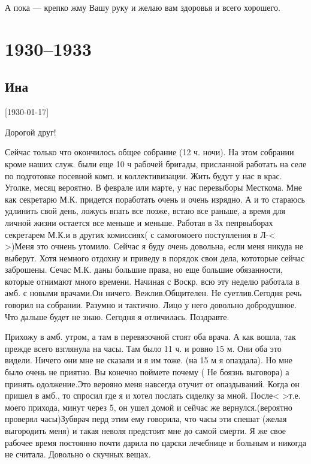 \documentclass[]{memoir}
\begin{document}
А пока --- крепко жму Вашу руку и желаю вам здоровья и всего хорошего.



\chapter{1930--1933}




\section{Ина}

[1930-01-17]



Дорогой друг!

Сейчас только что окончилось общее собрание (12 ч. ночи). На этом собрании кроме наших служ. были еще 10 ч рабочей бригады, присланной работать на селе по подготовке посевной комп. и коллективизации. Жить будут у нас в крас. Уголке, месяц вероятно. В феврале или марте, у нас перевыборы Месткома. Мне как секретарю М.К. придется поработать очень и очень изрядно. А и то стараюсь удлинить свой день, ложусь впать все позже, встаю все раньше, а время для личной жизни остается все меньше и меньше. Работая в 3х пепрвыборах секретарем М.К.и в других комиссиях( с самогомоего поступления в Л-< >)Меня это очнень утомило. Сейчас я буду очень довольна, если меня никуда не выберут. Хотя немного отдохну и приведу в порядок свои дела, кототорые сейчас заброшены. Сечас М.К. даны большие права, но еще большие обязанности, которые отнимают много времени. Начиная с Воскр. всю эту неделю работала в амб. с новыми врачами.Он ничего. Вежлив.Общителен. Не суетлив.Сегодня речь говорил на собрании. Разумно и тактично. Лицо у него довольно добродушное. Что дальше будет не знаю. Сегодня я отличилась. Поздравте.

Прихожу в амб. утром, а там в перевязочной стоят оба врача. А как вошла, так прежде всего взглянула на часы. Там было 11 ч. и ровно 15 м. Они оба это видели. Ничего они мне не сказали и я им тоже. (на 15 м я опаздала). Но мне было очень не приятно. Вы конечно поймете почему ( Не боязнь выговора) а принять одолжение.Это верояно меня навсегда отучит от опаздываний. Когда он пришел в амб., то спросил где я и хотел послать сиделку за мной. После< >т.е. моего прихода, минут через 5, он ушел домой и сейчас же вернулся.(вероятно проверял часы)Зубврач перд этим ему говорила, что часы эти спешат (желая выгородить меня) и такая неволя предстоит мне до самой смерти. Я же свое рабочее время постоянно почти дарила по царски лечебнице и больным и никогда не считала.
Довольно о скучных вещах.
\end{document}
